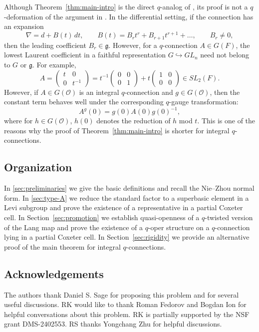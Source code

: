 \documentclass[11pt]{amsart}
\numberwithin{equation}{section}
\theoremstyle{definition}
\theoremstyle{remark}
\begin{document}
Although Theorem~\ref{thm:main-intro} is the direct $q$-analog of \cite{FZ}, its proof is not a $q$-deformation of the argument in \cite{FZ}. In the differential setting, if the connection has an expansion
\[
\nabla=d+B(t)\,dt, 
\qquad
B(t)=B_{r}t^{r}+B_{r+1}t^{r+1}+\ldots, \qquad
B_r\neq 0,
\]
then the leading coefficient $B_r\in\mathfrak{g}$. However, for a $q$-connection $A\in G(F)$, the lowest Laurent coefficient in a faithful representation $G\hookrightarrow GL_n$ need not belong to $G$ or $\mathfrak{g}$. For example, 
\[
A=\begin{pmatrix}
    t & 0\\
    0 & t^{-1}
\end{pmatrix}
=
t^{-1}\begin{pmatrix}
    0 & 0\\
    0 & 1
\end{pmatrix}
+
t\begin{pmatrix}
    1 & 0\\
    0 & 0
\end{pmatrix}
\in
SL_{2}(F).
\]
However, if $A\in G(\mathcal{O})$ is an integral $q$-connection and $g\in G(\mathcal{O})$, then the constant term behaves well under the corresponding $q$-gauge transformation:
\[
A^g(0)=g(0)A(0)g(0)^{-1},
\]
where for $h\in G(\mathcal{O})$, $h(0)$ denotes the reduction of $h$ mod $t$. This is one of the reasons why the proof of Theorem~\ref{thm:main-intro} is shorter for integral $q$-connections.
\subsection*{Organization}
In \cref{sec:preliminaries} we give the basic definitions and recall the Nie--Zhou
normal form. In \cref{sec:type-A} we reduce the standard factor to a superbasic element in a Levi subgroup and prove the existence of a representative in a partial Coxeter cell. In Section~\ref{sec:promotion} we establish quasi-openness of a
$q$-twisted version of the Lang map and prove the existence of a $q$-oper structure on a $q$-connection lying in a partial Coxeter cell. In Section~\ref{sec:rigidity} we provide an alternative proof of the main theorem for integral $q$-connections.
\subsection{Acknowledgements}The authors thank Daniel S. Sage for proposing this problem and for several useful discussions. RK would like to thank Roman Fedorov and Bogdan Ion for helpful conversations about this problem. RK is partially supported by the NSF grant DMS-2402553. RS thanks Yongchang Zhu for helpful discussions. 
\end{document}
